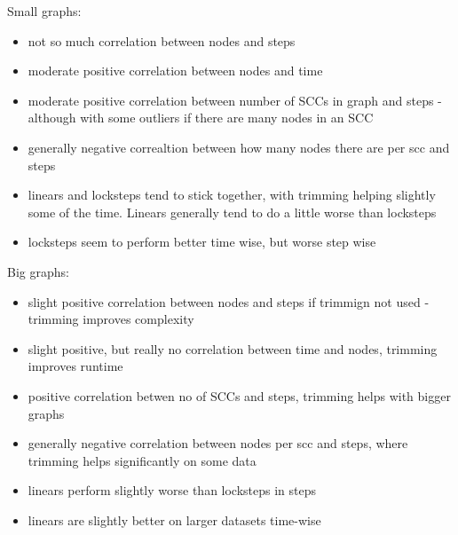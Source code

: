\documentclass[../master/master.tex]{subfiles}
\begin{document}
Small graphs:
\begin{itemize}
\item not so much correlation between nodes and steps
\item moderate positive correlation between nodes and time
\item moderate positive correlation between number of SCCs in graph and steps - although with some outliers if there are many nodes in an SCC
\item generally negative correaltion between how many nodes there are per scc and steps
\item linears and locksteps tend to stick together, with trimming helping slightly some of the time. Linears generally tend to do a little worse than locksteps
\item locksteps seem to perform better time wise, but worse step wise
\end{itemize}
Big graphs:
\begin{itemize}
\item slight positive correlation between nodes and steps if trimmign not used - trimming improves complexity
\item slight positive, but really no correlation between time and nodes, trimming improves runtime
\item positive correlation betwen no of SCCs and steps, trimming helps with bigger graphs
\item generally negative correlation between nodes per scc and steps, where trimming helps significantly on some data
\item linears perform slightly worse than locksteps in steps
\item linears are slightly better on larger datasets time-wise
\end{itemize}
\end{document}
